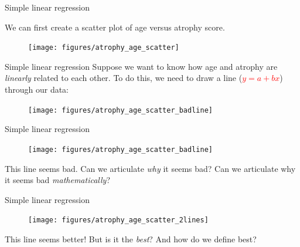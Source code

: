 \documentclass[10pt,t]{beamer}
\begin{document}
\begin{frame}{Simple linear regression}

We can first create a scatter plot of age versus atrophy score.

\vspace{0.3cm}

\begin{figure}
	\centering \texttt{[image: figures/atrophy\_age\_scatter]}
\end{figure}

\end{frame}

\begin{frame}{Simple linear regression}
Suppose we want to know how age and atrophy are \textit{linearly} related to each other. To do this, we need to draw a line (\textcolor{red}{$y = a + bx$}) through our data:

\vspace{0.3cm}
\begin{figure}
\centering \texttt{[image: figures/atrophy\_age\_scatter\_badline]}
\end{figure}

\end{frame}

\begin{frame}{Simple linear regression}


\begin{figure}
	\centering \texttt{[image: figures/atrophy\_age\_scatter\_badline]}
\end{figure}

\vspace{0.3cm}

This line seems bad. Can we articulate \textit{why} it seems bad? Can we articulate why it seems bad \textit{mathematically}?

\end{frame}

\begin{frame}{Simple linear regression}

\begin{figure}
	\centering \texttt{[image: figures/atrophy\_age\_scatter\_2lines]}
\end{figure}

\vspace{0.3cm}
\small This line seems better! But is it the \textit{best}? And how do we define best?

\end{frame}
\end{document}
